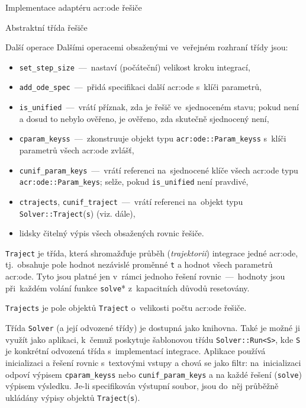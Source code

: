\documentclass[thesis=M,czech]{FITthesis}[2012/06/26]
\newcommand{\acrlabel}[1]{acr:#1}
\newcommand{\acr}[1]{\acrshort{\acrlabel{#1}}}
\newcommand{\id}[1]{\texttt{#1}}
\newcommand{\hl}[1]{\textit{#1}}
\newcommand{\name}[1]{\hl{#1}}
\begin{document}
\begin{section}{Implementace adaptéru \acr{ode} řešiče}
\begin{subsection}{Abstraktní třída řešiče}
\begin{subsubsection}{Další operace}\label{sss:impl:ode:solver:op}
Dalšími operacemi obsaženými ve~veřejném rozhraní třídy jsou:
\begin{itemize}
\item \id{set\_\-step\_\-size}~---~nastaví (počáteční)
   velikost kroku integrací,
\item \id{add\_\-ode\_\-spec}~---~přidá specifikaci další \acr{ode}
   s~klíči parametrů,
\item \id{is\_\-unified}~---~vrátí příznak, zda je řešič ve~sjednoceném stavu;
   pokud není a dosud to nebylo ověřeno,
   je ověřeno, zda skutečně sjednocený není,
\item \id{cparam\_\-keyss}~---~zkonstruuje objekt typu
   \id{\acr{ode}::\-Param\_\-keyss} s~klíči parametrů všech \acr{ode} zvlášť,
\item \id{cunif\_\-param\_\-keys}~---~vrátí referenci na~sjednocené klíče
   všech \acr{ode} typu \id{\acr{ode}::\-Param\_\-keys};
   selže, pokud \id{is\_\-unified} není pravdivé,
\item \id{ctrajects}, \id{cunif\_\-traject}~---~vrátí referenci
   na~objekt typu \id{Solver::\-Traject}(\id{s}) (viz. dále),
\item lidsky čitelný výpis všech obsažených rovnic řešiče.
\end{itemize}
\end{subsubsection} %


\begin{paragraph}{\id{Traject}}\label{p:impl:ode:solver:op:traj}
je třída, která shromažďuje průběh (\name{trajektorii})
integrace jedné \acr{ode},
tj.~obsahuje pole hodnot nezávislé proměnné \id{t}
a hodnot všech parametrů \acr{ode}.
Tyto jsou platné jen v~rámci jednoho
řešení rovnic~---~hodnoty jsou při~každém volání funkce \id{solve}*
z~kapacitních důvodů resetovány.

\id{Trajects} je pole objektů \id{Traject} o~velikosti
počtu \acr{ode} řešiče.
\end{paragraph} %



\bigskip

Třída \id{Solver} (a její odvozené třídy) je dostupná jako knihovna.
Také je možné ji využít jako aplikaci,
k~čemuž poskytuje šablonovou třídu \id{Solver::\-Run<S>},
kde \id{S} je konkrétní odvozená třída s~implementací integrace.
Aplikace používá inicializaci a řešení rovnic
s~textovými vstupy a chová se jako filtr:
na~inicializaci odpoví výpisem
\id{cparam\_\-keyss} nebo \id{cunif\_\-param\_\-keys}
a na každé řešení (\id{solve}) výpisem výsledku.
Je-li specifikován výstupní soubor,
jsou do~něj průběžně ukládány
výpisy objektů \id{Traject}(\id{s}).
\end{subsection} %


\end{section}
\end{document}
